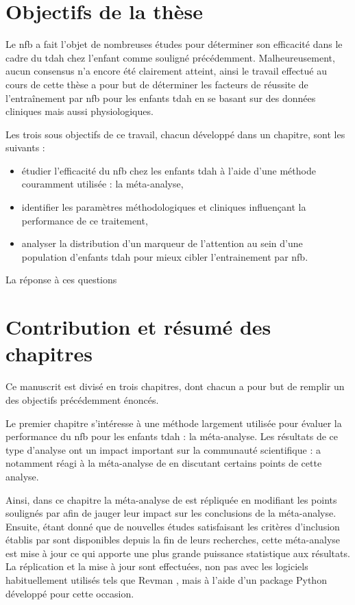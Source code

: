 \section{Objectifs de la thèse}
Le \gls{nfb} a fait l'objet de nombreuses études pour déterminer son efficacité dans le cadre du \gls{tdah} chez l'enfant comme souligné précédemment.
Malheureusement, aucun consensus n'a encore été clairement atteint, ainsi le travail effectué au cours de cette thèse a pour but de déterminer les facteurs 
de réussite de l'entraînement par \gls{nfb} pour les enfants \gls{tdah} en se basant sur des données cliniques mais aussi physiologiques. 

Les trois sous objectifs de ce travail, chacun développé dans un chapitre, sont les suivants :
\renewcommand{\labelitemi}{$\bullet$}
\renewcommand{\labelitemii}{$\cdot$}
\begin{itemize}
\item étudier l'efficacité du \gls{nfb} chez les enfants \gls{tdah} à l'aide d'une méthode couramment utilisée : la méta-analyse,
\item identifier les paramètres méthodologiques et cliniques influençant la performance de ce traitement,
\item analyser la distribution d'un marqueur de l'attention au sein d'une population d'enfants \gls{tdah} pour mieux cibler
l'entrainement par \gls{nfb}. 
\end{itemize}

La réponse à ces questions 

\section{Contribution et résumé des chapitres}

Ce manuscrit est divisé en trois chapitres, dont chacun a pour but de remplir un des objectifs précédemment énoncés.

Le premier chapitre s'intéresse à une méthode largement utilisée pour évaluer la performance du \gls{nfb} pour les enfants \gls{tdah} 
\citep{Sonuga-Barke2013, Micoulaud2014, Cortese2016} : la méta-analyse. Les résultats de ce type d'analyse ont un impact important sur la
communauté scientifique : \citet{Micoulaud2016} a notamment réagi à la méta-analyse de \citet{Cortese2016} en discutant certains points de cette 
analyse. 

Ainsi, dans ce chapitre la méta-analyse de \citet{Cortese2016} est répliquée en modifiant les points soulignés par \citet{Micoulaud2016}
afin de jauger leur impact sur les conclusions de la méta-analyse. Ensuite, étant donné que de nouvelles études satisfaisant les critères d'inclusion
établis par \citet{Cortese2016} sont disponibles depuis la fin de leurs recherches, cette méta-analyse est mise à jour ce qui apporte une plus grande puissance
statistique aux résultats. La réplication et la mise à jour sont effectuées, non pas avec les logiciels habituellement utilisés tels que Revman \citep{Revman},
mais à l'aide d'un package Python développé pour cette occasion. 

